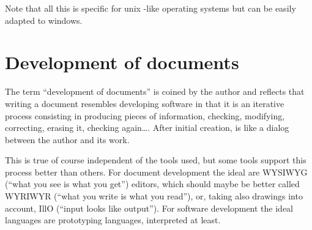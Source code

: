 Note that all this is specific for unix -like operating systems 
but can be easily adapted to windows. 

\section{Development of documents}\label{sec:devel}

The term ``development of documents'' is coined by the author 
and reflects that writing a document 
resembles developing software 
in that it is an iterative process consisting in producing pieces of information, 
checking, modifying, correcting, erasing it, checking again\dots. 
After initial creation, is like a dialog between the author and its work. 

This is true of course independent of the tools used, 
but some tools support this process better than others. 
For document development the ideal are WYSIWYG (``what you see is what you get'') editors, 
which should maybe be better called WYRIWYR (``what you write is what you read''), 
or, taking also drawings into account, IllO (``input looks like output''). %
For software development the ideal languages are prototyping languages, interpreted at least. 

